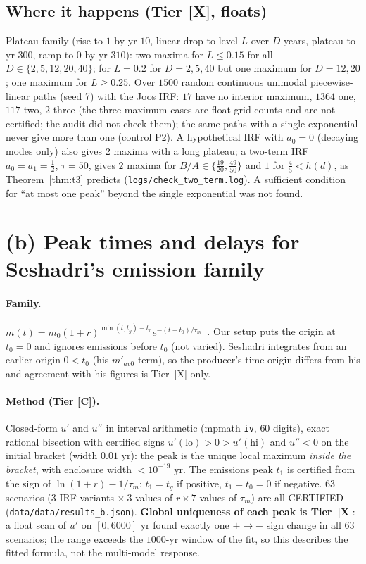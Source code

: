 \documentclass[10pt]{article}
\newcommand{\tier}[1]{\textsf{[#1]}}
\newcommand{\tC}{\tier{C}}
\newcommand{\tX}{\tier{X}}
\theoremstyle{plain}
\begin{document}
\subsection{Where it happens (Tier \tX{}, floats)}
Plateau family (rise to $1$ by yr $10$, linear drop to level $L$ over $D$ years, plateau to yr $300$, ramp to $0$ by yr $310$): two maxima for $L\le0.15$ for all $D\in\{2,5,12,20,40\}$; for $L=0.2$ for $D=2,5,40$ but one maximum for $D=12,20$; one maximum for $L\ge0.25$. Over $1500$ random continuous unimodal piecewise-linear paths (seed 7) with the Joos IRF: $17$ have no interior maximum, $1364$ one, $117$ two, $2$ three (the three-maximum cases are float-grid counts and are not certified; the audit did not check them); the same paths with a single exponential never give more than one (control P2). A hypothetical IRF with $a_0=0$ (decaying modes only) also gives $2$ maxima with a long plateau; a two-term IRF $a_0=a_1=\tfrac12$, $\tau=50$, gives $2$ maxima for $B/A\in\{\tfrac{19}{20},\tfrac{49}{50}\}$ and $1$ for $\tfrac45<h(d)$, as Theorem~\ref{thm:t3} predicts (\texttt{logs/check\_two\_term.log}). A sufficient condition for ``at most one peak'' beyond the single exponential was not found.

\section{(b) Peak times and delays for Seshadri's emission family}\label{sec:b}
\paragraph{Family.} $m(t)=m_0(1+r)^{\min(t,t_g)-t_0}e^{-(t-t_0)/\tau_m}$~\cite{sesh}. Our setup puts the origin at $t_0=0$ and ignores emissions before $t_0$ (not varied). Seshadri integrates from an earlier origin $0<t_0$ (his $m'_{av0}$ term), so the producer's time origin differs from his and agreement with his figures is Tier~\tX{} only.
\paragraph{Method (Tier \tC{}).} Closed-form $u'$ and $u''$ in interval arithmetic (mpmath \texttt{iv}, $60$ digits), exact rational bisection with certified signs $u'(\mathrm{lo})>0>u'(\mathrm{hi})$ and $u''<0$ on the initial bracket (width $0.01$ yr): the peak is the unique local maximum \emph{inside the bracket}, with enclosure width $<10^{-19}$ yr. The emissions peak $t_1$ is certified from the sign of $\ln(1+r)-1/\tau_m$: $t_1=t_g$ if positive, $t_1=t_0=0$ if negative. $63$ scenarios ($3$ IRF variants $\times\ 3$ values of $r\times 7$ values of $\tau_m$) are all CERTIFIED (\texttt{data/data/results\_b.json}). \textbf{Global uniqueness of each peak is Tier~\tX{}}: a float scan of $u'$ on $[0,6000]$ yr found exactly one $+\to-$ sign change in all $63$ scenarios; the range exceeds the $1000$-yr window of the fit, so this describes the fitted formula, not the multi-model response.
\end{document}
